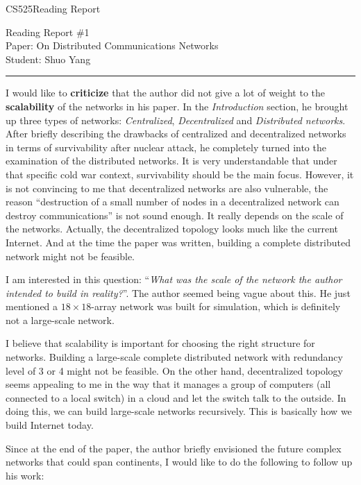\documentclass[11pt]{article}
\def\CourseCode{CS525}
\def\ReportNo{1}
\def\Category{Reading Report}
\def\PaperTitle{On Distributed Communications Networks}
\def\Author{Shuo Yang}
\begin{document}
\noindent

\CourseCode \hfill \Category

\begin{center}
Reading Report \#\ReportNo\\
Paper: \PaperTitle\\
Student: \Author\\
\end{center}

\hrule\smallskip
\vspace{1.5em}
I would like to \textbf{criticize} that the author did not give a lot of weight
to the \textbf{scalability} of the networks in his paper. In the 
\emph{Introduction} section, he brought up three types of networks:
\emph{Centralized}, \emph{Decentralized} and \emph{Distributed
  networks}. After briefly describing the drawbacks of centralized and
decentralized networks in terms of survivability after nuclear
attack, he completely turned into the examination of the distributed
networks. It is very understandable that under that specific cold war
context, survivability should be the main focus.  
However, it is not convincing to me that decentralized
networks are also vulnerable, the reason ``destruction of a small
number of nodes in a decentralized network can destroy
communications'' is not sound enough. It really depends on the scale
of the networks. Actually, the decentralized
topology looks much like the current Internet. And at the time the
paper was written, building a complete distributed network might not be
feasible.

I am interested in this question: ``\emph{What was the scale of the network
the author intended to build in reality?}''. The author seemed being
vague about this. He just mentioned a $18\times18$-array network was
built for simulation, which is definitely not a large-scale network.

I believe that scalability is important for choosing the right
structure for networks. Building a large-scale complete distributed
network with redundancy level of 3 or 4 might not be feasible. On the
other hand, decentralized topology seems appealing to me in the way
that it manages a group of computers (all connected to a local switch)
in a cloud and let the switch talk to the outside. In doing this, we
can build large-scale networks recursively. This is basically how we
build Internet today.

Since at the end of the paper, the author briefly envisioned the
future complex networks that could span continents,  
I would like to do the following to follow up his work:\\
\end{document}
